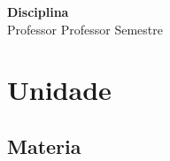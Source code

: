 \documentclass[12pt,twoside]{article}
\newcommand{\capa}[3]{
	\begin{center}
		\vspace*{\fill}
		{\Huge\textbf{#1}} \\
		\vspace{2em}
		{\large Professor #2}
		\vfill
		#3
	\end{center}
	\newpage
}
\newcommand{\unidadetitle}{}
\newcommand{\unidade}[1]{
	\clearpage
	\par
	\thispagestyle{empty}
	\renewcommand{\unidadetitle}{{\thesection} - #1}
	\vspace*{\fill}
	\section{#1}
}
\newcommand{\materia}[1]{
	\clearpage
	\subsection{#1}
}
\begin{document}
	 \pagestyle{empty}
	
	 \capa{Disciplina}{Professor}{Semestre}
	
	 \tableofcontents
	
	\pagestyle{fancy}

    \unidade{Unidade}
        \materia{Materia}
            \lipsum

\end{document}
